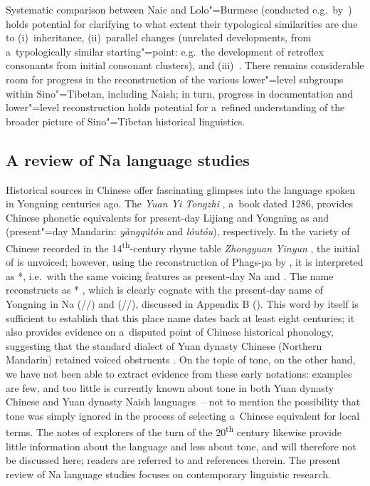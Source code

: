 Systematic comparison between {Naic} and Lolo"={Burmese} (conducted
e.g.~by~\citealt{li2015}) holds potential for clarifying to what extent their typological similarities are due to (i)~inheritance, (ii)~parallel changes (unrelated developments,
from a~typologically similar starting"=point: e.g.~the development of retroflex consonants from
initial consonant clusters), and (iii)~. There remains considerable room for
progress in the reconstruction of the various lower"=level subgroups within Sino"=Tibetan, including
{Naish}; in turn, progress in documentation and lower"=level reconstruction holds potential for a~refined understanding of the broader picture of Sino"=Tibetan historical linguistics.


\subsection{A review of Na language studies}
\label{sec:previousstudiesofthenalanguage}

Historical sources in Chinese offer fascinating glimpses into the language spoken in Yongning centuries ago. The \textit{Yuan {Yi} 
Tongzhi} {\kern-3pt}, a~book dated 1286, provides {Chinese} phonetic equivalents for present-day Lijiang and Yongning as  and  (present"=day {Mandarin}: \textit{yàngqútóu} and \textit{lóutóu}), respectively. In the variety of {Chinese} recorded in the 14\textsuperscript{th}-century rhyme table \textit{Zhongyuan 
Yinyun} {\kern-3pt}, the initial of  is unvoiced; however, using the reconstruction of {\apostrophe}Phags-pa by \citet{coblin2007}, it is interpreted as *, i.e.\ with the same voicing features as present-day Na and . The 
name  reconstructs as * \citep[487]{jacquesetal2011}, which is clearly cognate with the present-day name of Yongning in Na (//) and  (//), discussed in Appendix B (). This word by itself is sufficient to establish that this place name dates back at least eight centuries; it also provides evidence on a~disputed point of Chinese historical phonology, suggesting that the standard dialect of Yuan dynasty Chinese (Northern Mandarin) retained voiced obstruents \citep[487]{jacquesetal2011}. On the topic of tone, on the other hand, we have not been able to extract evidence from these early notations: examples are few, and too little is currently known about tone in both Yuan dynasty Chinese and Yuan dynasty {Naish} languages~-- not to mention the possibility that tone was simply ignored in the process of selecting a~Chinese equivalent for local terms. The notes of explorers of the turn of the 20\textsuperscript{th} century likewise provide little information about the language and less about tone, and will therefore not be discussed here; readers are referred to \citet{michaudetal2010} and references therein. The present review of Na language studies focuses on contemporary linguistic research.  

